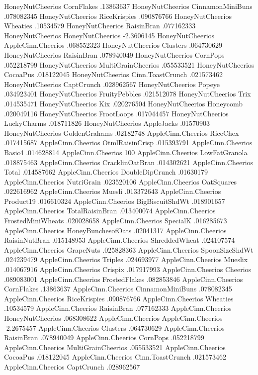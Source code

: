 HoneyNutCheerios	CornFlakes	.13863637
HoneyNutCheerios	CinnamonMiniBuns	.078082345
HoneyNutCheerios	RiceKrispies	.090876766
HoneyNutCheerios	Wheaties	.10534579
HoneyNutCheerios	RaisinBran	.077162333
HoneyNutCheerios	HoneyNutCheerios	-2.3606145
HoneyNutCheerios	AppleCinn.Cheerios	.068552323
HoneyNutCheerios	Clusters	.064730629
HoneyNutCheerios	RaisinBran	.078940049
HoneyNutCheerios	CornPops	.052218799
HoneyNutCheerios	MultiGrainCheerios	.055533521
HoneyNutCheerios	CocoaPus	.018122045
HoneyNutCheerios	Cinn.ToastCrunch	.021573462
HoneyNutCheerios	CaptCrunch	.028962567
HoneyNutCheerios	Popeye	.034923401
HoneyNutCheerios	FruityPebbles	.021512078
HoneyNutCheerios	Trix	.014535471
HoneyNutCheerios	Kix	.020276504
HoneyNutCheerios	Honeycomb	.020049116
HoneyNutCheerios	FrootLoops	.017044457
HoneyNutCheerios	LuckyCharms	.018711826
HoneyNutCheerios	AppleJacks	.01570903
HoneyNutCheerios	GoldenGrahams	.02182748
AppleCinn.Cheerios	RiceChex	.017415687
AppleCinn.Cheerios	OtmlRaisinCrisp	.015393791
AppleCinn.Cheerios	Basic4	.014628814
AppleCinn.Cheerios	100%
AppleCinn.Cheerios	LowFatGranola	.018875463
AppleCinn.Cheerios	CracklinOatBran	.014302621
AppleCinn.Cheerios	Total	.014587662
AppleCinn.Cheerios	DoubleDipCrunch	.01630179
AppleCinn.Cheerios	NutriGrain	.023520106
AppleCinn.Cheerios	OatSquares	.022616962
AppleCinn.Cheerios	Muesli	.013372643
AppleCinn.Cheerios	Product19	.016610324
AppleCinn.Cheerios	BigBiscuitShdWt	.018901657
AppleCinn.Cheerios	TotalRaisinBran	.013400074
AppleCinn.Cheerios	FrostedMiniWheats	.020028658
AppleCinn.Cheerios	SpecialK	.016285673
AppleCinn.Cheerios	HoneyBunchesofOats	.02041317
AppleCinn.Cheerios	RaisinNutBran	.015148953
AppleCinn.Cheerios	ShreddedWheat	.024107574
AppleCinn.Cheerios	GrapeNuts	.025828363
AppleCinn.Cheerios	SpoonSizeShdWt	.024239479
AppleCinn.Cheerios	Triples	.024693977
AppleCinn.Cheerios	Mueslix	.014067916
AppleCinn.Cheerios	Crispix	.017917993
AppleCinn.Cheerios	Cheerios	.089083001
AppleCinn.Cheerios	FrostedFlakes	.082853846
AppleCinn.Cheerios	CornFlakes	.13863637
AppleCinn.Cheerios	CinnamonMiniBuns	.078082345
AppleCinn.Cheerios	RiceKrispies	.090876766
AppleCinn.Cheerios	Wheaties	.10534579
AppleCinn.Cheerios	RaisinBran	.077162333
AppleCinn.Cheerios	HoneyNutCheerios	.068308622
AppleCinn.Cheerios	AppleCinn.Cheerios	-2.2675457
AppleCinn.Cheerios	Clusters	.064730629
AppleCinn.Cheerios	RaisinBran	.078940049
AppleCinn.Cheerios	CornPops	.052218799
AppleCinn.Cheerios	MultiGrainCheerios	.055533521
AppleCinn.Cheerios	CocoaPus	.018122045
AppleCinn.Cheerios	Cinn.ToastCrunch	.021573462
AppleCinn.Cheerios	CaptCrunch	.028962567
